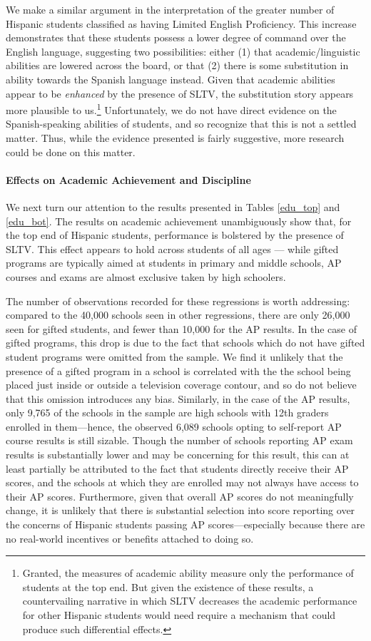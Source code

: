 \documentclass[11pt]{article}
\begin{document}
We make a similar argument in the interpretation of the greater number of Hispanic students classified as having Limited English Proficiency. This increase demonstrates that these students possess a lower degree of command over the English language, suggesting two possibilities: either (1) that academic/linguistic abilities are lowered across the board, or that (2) there is some substitution in ability towards the Spanish language instead. Given that academic abilities appear to be \textit{enhanced} by the presence of SLTV, the substitution story appears more plausible to us.\footnote{ Granted, the measures of academic ability measure only the performance of students at the top end. But given the existence of these results, a countervailing narrative in which SLTV decreases the academic performance for other Hispanic students would need require a mechanism that could produce such differential effects.} Unfortunately, we do not have direct evidence on the Spanish-speaking abilities of students, and so recognize that this is not a settled matter. Thus, while the evidence presented is fairly suggestive, more research could be done on this matter.

\paragraph{Effects on Academic Achievement and Discipline} 
We next turn our attention to the results presented in Tables \ref{edu_top} and \ref{edu_bot}. The results on academic achievement unambiguously show that, for the top end of Hispanic students, performance is bolstered by the presence of SLTV. This effect appears to hold across students of all ages --- while gifted programs are typically aimed at students in primary and middle schools, AP courses and exams are almost exclusive taken by high schoolers. 

 The number of observations recorded for these regressions is worth addressing: compared to the 40,000 schools seen in other regressions, there are only 26,000 seen for gifted students, and fewer than 10,000 for the AP results. In the case of gifted programs, this drop is due to the fact that schools which do not have gifted student programs were omitted from the sample. We find it unlikely that the presence of a gifted program in a school is correlated with the the school being placed just inside or outside a television coverage contour, and so do not believe that this omission introduces any bias. Similarly, in the case of the AP results, only 9,765 of the schools in the sample are high schools with 12th graders enrolled in them---hence, the observed 6,089 schools opting to self-report AP course results is still sizable. Though the number of schools reporting AP exam results is substantially lower and may be concerning for this result, this can at least partially be attributed to the fact that students directly receive their AP scores, and the schools at which they are enrolled may not always have access to their AP scores. Furthermore, given that overall AP scores do not meaningfully change, it is unlikely that there is substantial selection into score reporting over the concerns of Hispanic students passing AP scores---especially because there are no real-world incentives or benefits attached to doing so.
\end{document}
